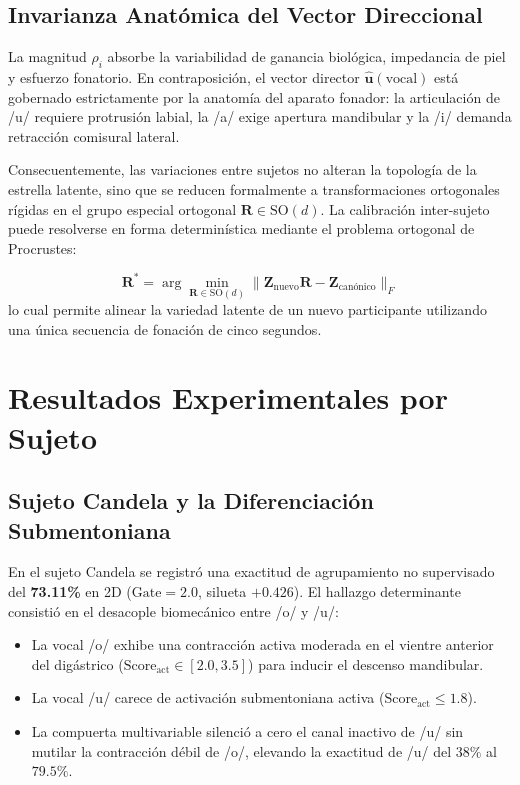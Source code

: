 \documentclass[11pt,a4paper]{article}
\begin{document}
\subsection{Invarianza Anatómica del Vector Direccional}
\label{subsec:invarianza_vectorial}

La magnitud $\rho_i$ absorbe la variabilidad de ganancia biológica, impedancia de piel y esfuerzo fonatorio. En contraposición, el vector director $\hat{\mathbf{u}}(\text{vocal})$ está gobernado estrictamente por la anatomía del aparato fonador: la articulación de /u/ requiere protrusión labial, la /a/ exige apertura mandibular y la /i/ demanda retracción comisural lateral. 

Consecuentemente, las variaciones entre sujetos no alteran la topología de la estrella latente, sino que se reducen formalmente a transformaciones ortogonales rígidas en el grupo especial ortogonal $\mathbf{R} \in \text{SO}(d)$. La calibración inter-sujeto puede resolverse en forma determinística mediante el problema ortogonal de Procrustes:

\begin{equation}
    \mathbf{R}^* = \arg\min_{\mathbf{R} \in \text{SO}(d)} \|\mathbf{Z}_{\text{nuevo}} \mathbf{R} - \mathbf{Z}_{\text{canónico}}\|_F
    \label{eq:procrustes}
\end{equation}
lo cual permite alinear la variedad latente de un nuevo participante utilizando una única secuencia de fonación de cinco segundos.

\section{Resultados Experimentales por Sujeto}
\label{sec:resultados_sujetos}

\subsection{Sujeto Candela y la Diferenciación Submentoniana}
\label{subsec:resultados_candela}

En el sujeto Candela se registró una exactitud de agrupamiento no supervisado del \textbf{73.11\%} en 2D ($\text{Gate} = 2.0$, silueta $+0.426$). El hallazgo determinante consistió en el desacople biomecánico entre /o/ y /u/:
\begin{itemize}
    \item La vocal /o/ exhibe una contracción activa moderada en el vientre anterior del digástrico ($\text{Score}_{\text{act}} \in [2.0, 3.5]$) para inducir el descenso mandibular.
    \item La vocal /u/ carece de activación submentoniana activa ($\text{Score}_{\text{act}} \le 1.8$).
    \item La compuerta multivariable silenció a cero el canal inactivo de /u/ sin mutilar la contracción débil de /o/, elevando la exactitud de /u/ del $38\%$ al $79.5\%$.
\end{itemize}
\end{document}
